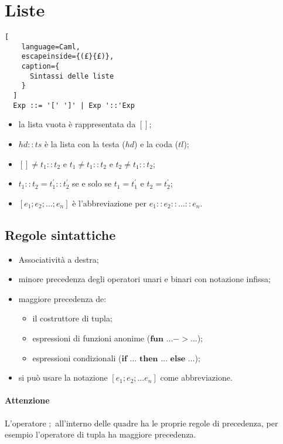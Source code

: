\clearpage
\section{Liste}
\begin{lstlisting}[
    language=Caml,
    escapeinside={(£}{£)},
    caption={
      Sintassi delle liste
    }
  ]
  Exp ::= '[' ']' | Exp '::'Exp
\end{lstlisting}

\begin{itemize}
  \item la lista vuota è rappresentata da $[]$;
  \item $hd::ts$ è la lista con la testa ($hd$) e la coda ($tl$);
  \item $[]\neq t_1::t_2$ e $t_1\neq t_1::t_2$ e $t_2\neq t_1::t_2$;
  \item $t_1::t_2=t_1^\prime::t_2^\prime$ se e solo se $t_1=t_1^\prime$ e $t_2
    =t_2^\prime$;
  \item $[e_1;e_2;\dots;e_n]$ è l'abbreviazione per $e_1::e_2::\dots::e_n$.
\end{itemize}

\subsection{Regole sintattiche}
\begin{itemize}
  \item Associatività a destra;
  \item minore precedenza degli operatori unari e binari con notazione infissa;
  \item maggiore precedenza de:
    \begin{itemize}
      \item il costruttore di tupla;
      \item espressioni di funzioni anonime ($\textbf{fun }\dots->\dots$);
      \item espressioni condizionali ($ \textbf{if }\dots \textbf{ then }\dots
        \textbf{ else }\dots$);
    \end{itemize}
  \item si può usare la notazione $[e_1;e_2;\dots e_n]$ come abbreviazione.
\end{itemize}
\paragraph{Attenzione}
L'operatore $;$ all'interno delle quadre ha le proprie regole di precedenza,
per esempio l'operatore di tupla ha maggiore precedenza.

